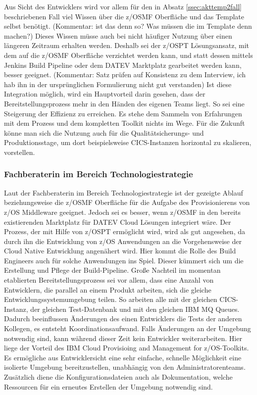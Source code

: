 Aus Sicht des Entwicklers wird vor allem für den in Absatz \ref{ssec:akttemp2fall} beschriebenen Fall viel Wissen über die z/OSMF Oberfläche und das Template selbst benötigt. (Kommentar: ist das denn so? Was müssen die im Template denn machen?)
Dieses Wissen müsse auch bei nicht häufiger Nutzung über einen längeren Zeitraum erhalten werden.
Deshalb sei der z/OSPT Lösungsansatz, mit dem auf die z/OSMF Oberfläche verzichtet werden kann, und statt dessen mittels Jenkins Build Pipeline oder dem DATEV \glqq Marktplatz\grqq{} gearbeitet werden kann, besser geeignet. (Kommentar: Satz prüfen auf Konsistenz zu dem Interview, ich hab ihn in der ursprünglichen Formulierung nicht gut verstanden)
Ist diese Integration möglich, wird ein Hauptvorteil darin gesehen, dass der Bereitstellungsprozess mehr in den Händen des eigenen Teams liegt.
So sei eine Steigerung der Effizienz zu erreichen.
Es stehe dem Sammeln von Erfahrungen mit dem Prozess und dem kompletten Toolkit nichts im Wege.
Für die Zukunft könne man sich die Nutzung auch für die Qualitätsicherungs- und Produktionsstage, um dort beispielsweise CICS-Instanzen horizontal zu skalieren, vorstellen.

\subsubsection{Fachberaterin im Bereich Technologiestrategie}
Laut der Fachberaterin im Bereich Technologiestrategie ist der gezeigte Ablauf beziehungsweise die z/OSMF Oberfläche für die Aufgabe des Provisionierens von z/OS Middleware geeignet.
Jedoch sei es besser, wenn z/OSMF in den bereits existierenden \glqq Marktplatz\grqq{} für DATEV Cloud Lösungen integriert wäre.
Der Prozess, der mit Hilfe von z/OSPT ermöglicht wird, wird als gut angesehen, da durch ihn die Entwicklung von z/OS Anwendungen an die Vorgehensweise der Cloud Native Entwicklung angenähert wird.
Hier kommt die Rolle des Build Engineers auch für solche Anwendungen ins Spiel.
Dieser kümmert sich um die Erstellung und Pflege der Build-Pipeline.
Große Nachteil im momentan etablierten Bereitstellungsprozess sei vor allem,  dass eine Anzahl von Entwicklern, die parallel an einem Produkt arbeiten, sich die gleiche Entwicklungssystemumgebung teilen.
So arbeiten alle mit der gleichen CICS-Instanz, der gleichen Test-Datenbank und mit den gleichen IBM MQ Queues.
Dadurch beeinflussen Änderungen des einen Entwicklers die Tests der anderen Kollegen, es entsteht Koordinationsaufwand.
Falls Änderungen an der Umgebung notwendig sind, kann während dieser Zeit kein Entwickler weiterarbeiten.
Hier liege der Vorteil des \glqq IBM Cloud Provisioing and Management for z/OS\grqq-Toolkits.
Es ermögliche aus Entwicklersicht eine sehr einfache, schnelle Möglichkeit eine isolierte Umgebung bereitzustellen, unabhängig von den Administratorenteams.
Zusätzlich diene die Konfigurationsdateien auch als Dokumentation, welche Ressourcen für ein erneutes Erstellen der Umgebung notwendig sind.

